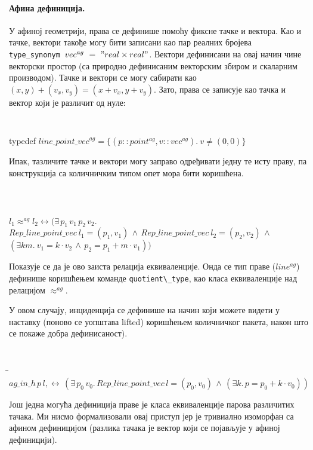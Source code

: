 \paragraph{Афина дефиниција.}
У афиној геометрији, права се дефинише помоћу фиксне тачке и
вектора. Као и тачке, вектори такође могу бити записани као пар
реалних бројева {\tt type\_synonym\ $vec^{ag}\ =\ "real \times
  real"$}. Вектори дефинисани на овај начин чине векторски простор (са
природно дефинисаним векторским збиром и скаларним производом). Тачке
и вектори се могу сабирати као $(x, y) + (v_x, v_y) = (x + v_x, y +
v_y)$. Зато, права се записује као тачка и вектор који је различит од
нуле: 
{\tt
\begin{tabbing}
typedef $\mathit{line\_point\_vec}^{ag} =\{(p::point^{ag}, v::vec^{ag}).\ v \neq (0, 0)\}$
\end{tabbing}
}

Ипак, тазличите тачке и вектори могу заправо одређивати једну те исту
праву, па конструкција са количничким типом опет мора бити коришћена.

{\tt
\begin{tabbing}
\hspace{5mm}\=\\
$l_1 \approx^{ag} l_2 \longleftrightarrow (\exists\,p_1\,v_1\,p_2\,v_2.$\\
\>$\mathit{Rep\_line\_point\_vec}\ l_1 = (p_1, v_1) \,\wedge\,  \mathit{Rep\_line\_point\_vec}\ l_2 = (p_2, v_2) \,\wedge$\\
\>$(\exists k m.\ v_1 = k\cdot v_2 \,\wedge\, p_2 = p_1 + m\cdot v_1))$
\end{tabbing}
}
\noindent Показује се да је ово заиста релација еквиваленције. Онда се
тип праве ($\mathit{line^{ag}}$) дефинише коришћењем команде
\verb|quotient\_type|, као класа еквиваленције над релацијом
$\approx^{ag}$.

У овом случају, инциденција се дефинише на начин који можете видети у
наставку (поново се уопштава lifted) коришћењем количничког пакета,
након што се покаже добра дефинисаност).

{\tt
\begin{tabbing}
\hspace{5mm}\=\hspace{5mm}\=\kill
$ag\_in\_h\,p\,l,\longleftrightarrow\,(\exists\,p_0\,v_0.\,\mathit{Rep\_line\_point\_vec}\,l = (p_0, v_0) \,\wedge\,  (\exists k.\,p = p_0 + k \cdot v_0))$
\end{tabbing}
}

Још једна могућа дефиниција праве је класа еквиваленције парова
различитих тачака. Ми нисмо формализовали овај приступ јер је
тривиално изоморфан са афином дефиницијом (разлика тачака је вектор
који се појављује у афиној дефиницији).

